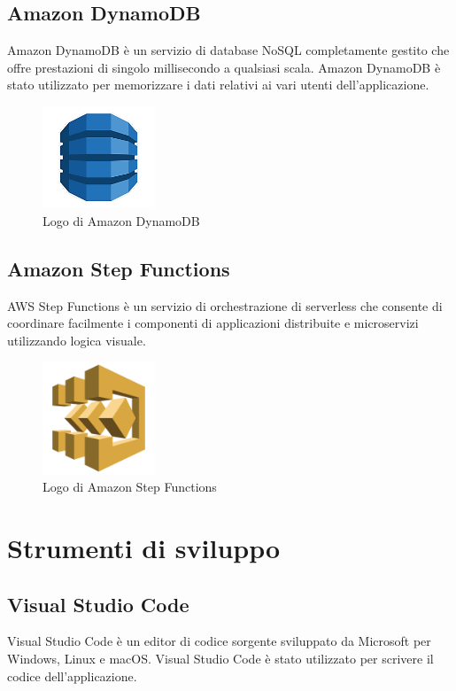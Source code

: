 \subsection{Amazon DynamoDB}
Amazon DynamoDB è un servizio di database NoSQL completamente gestito che offre prestazioni di singolo millisecondo a qualsiasi scala. Amazon DynamoDB è stato utilizzato per memorizzare i dati relativi ai vari utenti dell'applicazione.

\begin{figure}[h]
  \centering
  \includegraphics[width=0.3\textwidth]{img/tecnologie/DynamoDB.png}
  \caption{Logo di Amazon DynamoDB}
  \label{fig:dynamodb}
\end{figure}

\subsection{Amazon Step Functions}
AWS Step Functions è un servizio di orchestrazione di serverless che consente di coordinare facilmente i componenti di applicazioni distribuite e microservizi utilizzando logica visuale. 

\begin{figure}[h]
  \centering
  \includegraphics[width=0.3\textwidth]{img/tecnologie/stepfunctions.png}
  \caption{Logo di Amazon Step Functions}
  \label{fig:stepfunctions}
\end{figure}

\section{Strumenti di sviluppo}
\subsection{Visual Studio Code}
Visual Studio Code è un editor di codice sorgente sviluppato da Microsoft per Windows, Linux e macOS. Visual Studio Code è stato utilizzato per scrivere il codice dell'applicazione.

